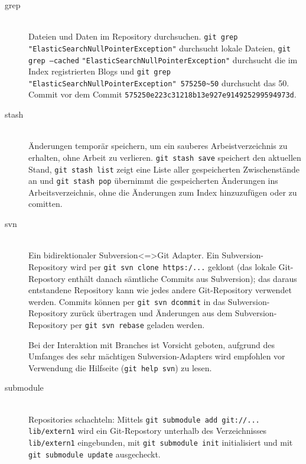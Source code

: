 \documentclass[a4paper, 12pt]{article}
\begin{document}
\begin{description}
  \item[grep] \hfill \\
  Dateien und Daten im Repository durchsuchen. \texttt{git grep} \verb|"|\texttt{ElasticSearchNullPointerException}\verb|"| durchsucht lokale Dateien, \texttt{git grep --cached} \verb|"|\texttt{ElasticSearchNullPointerException}\verb|"| durchsucht die im Index registrierten Blogs und \texttt{git grep }\verb|"|\texttt{ElasticSearchNullPointerException}\verb|"|\texttt{ 575250}\verb|~|\texttt{50} durchsucht das 50. Commit vor dem Commit \texttt{575250e223c31218b13e927e914925299594973d}.
  
  
  \item[stash] \hfill \\
  Änderungen temporär speichern, um ein sauberes Arbeistverzeichnis zu erhalten, ohne Arbeit zu verlieren. \texttt{git stash save} speichert den aktuellen Stand, \texttt{git stash list} zeigt eine Liste aller gespeicherten Zwischenstände an und \texttt{git stash pop} übernimmt die gespeicherten Änderungen ins Arbeitsverzeichnis, ohne die Änderungen zum Index hinzuzufügen oder zu comitten.
  
  \item[svn] \hfill \\
  Ein bidirektionaler Subversion<=>Git Adapter. Ein Subversion-Repository wird per \texttt{git svn clone https:/...} geklont (das lokale Git-Repostory enthält danach sämtliche Commits aus Subversion); das daraus entstandene Repository kann wie jedes andere Git-Repository verwendet werden. Commits können per \texttt{git svn dcommit} in das Subversion-Repository zurück übertragen und Änderungen aus dem Subversion-Repository per \texttt{git svn rebase} geladen werden.
  
  Bei der Interaktion mit Branches ist Vorsicht geboten, aufgrund des Umfanges des sehr mächtigen Subversion-Adapters wird empfohlen vor Verwendung die Hilfseite (\texttt{git help svn}) zu lesen.

  \item[submodule] \hfill \\
  Repositories schachteln: Mittels \texttt{git submodule add git://... lib/extern1} wird ein Git-Repostory unterhalb des Verzeichnisses \texttt{lib/extern1} eingebunden, mit \texttt{git submodule init} initialisiert und mit \texttt{git submodule update} ausgecheckt.
  

\end{description}
\end{document}
